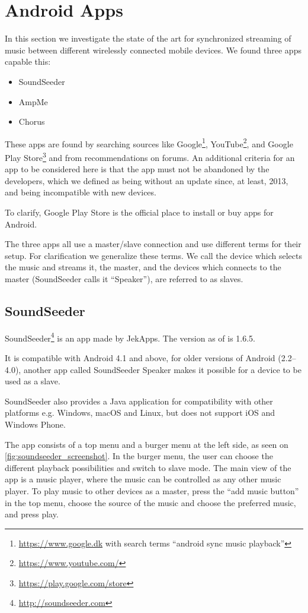 \section{Android Apps}\label{sec:sota_apps}
In this section we investigate the state of the art for synchronized streaming of music between different wirelessly connected mobile devices.
We found three apps capable this:
\begin{itemize}
    \item SoundSeeder
    \item AmpMe
    \item Chorus
\end{itemize}

These apps are found by searching sources like Google\footnote{\url{https://www.google.dk} with search terms ``android sync music playback''}, YouTube\footnote{\url{https://www.youtube.com/}}, and Google Play Store\footnote{\url{https://play.google.com/store}} and from recommendations on forums.
An additional criteria for an app to be considered here is that the app must not be abandoned by the developers,
which we defined as being without an update since, at least, 2013, and being incompatible with new devices.

To clarify, Google Play Store is the official place to install or buy apps for Android.

The three apps all use a master/slave connection and use different terms for their setup.
For clarification we generalize these terms.
We call the device which selects the music and streams it, the master, and the devices which connects to the master (SoundSeeder calls it ``Speaker''), are referred to as slaves.

\subsection{SoundSeeder}\label{subsec:soundseeder}
SoundSeeder\footnote{\url{http://soundseeder.com}} is an app made by JekApps.
The  version as of  is 1.6.5.

It is compatible with Android 4.1 and above, for older versions of Android (2.2--4.0),
another app called SoundSeeder Speaker makes it possible for a device to be used as a slave.

SoundSeeder also provides a Java application for compatibility with other platforms e.g. Windows, macOS and Linux, but does not support iOS and Windows Phone\cite{soundseeder_ios}.

The app consists of a top menu and a burger menu at the left side, as seen on \cref{fig:soundseeder_screenshot}.
In the burger menu, the user can choose the different playback possibilities and switch to slave mode.
The main view of the app is a music player, where the music can be controlled as any other music player.
To play music to other devices as a master, press the ``add music button'' in the top menu,
choose the source of the music and choose the preferred music, and press play.

